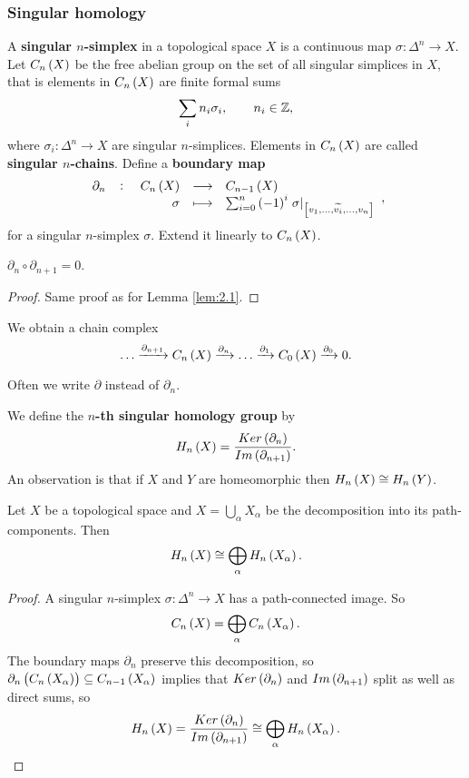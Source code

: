 \subsubsection{Singular homology}


A \textbf{singular $ n $-simplex} in a topological space $ X $ is a continuous map $ \sigma : \Delta^n \to X $. Let $ C_n\br{X} $ be the free abelian group on the set of all singular simplices in $ X $, that is elements in $ C_n\br{X} $ are finite formal sums
$$ \sum_i n_i \sigma_i, \qquad n_i \in \mathbb{Z}, $$
where $ \sigma_i : \Delta^n \to X $ are singular $ n $-simplices. Elements in $ C_n\br{X} $ are called \textbf{singular $ n $-chains}. Define a \textbf{boundary map}
$$ \function[\partial_n]{C_n\br{X}}{C_{n - 1}\br{X}}{\sigma}{\sum_{i = 0}^n \br{-1}^i\eval{\sigma}_{\sbr{v_1, \dots, \widetilde{v_i}, \dots, v_n}}}, $$
for a singular $ n $-simplex $ \sigma $. Extend it linearly to $ C_n\br{X} $.

\begin{lemma}
$ \partial_n \circ \partial_{n + 1} = 0 $.
\end{lemma}

\begin{proof}
Same proof as for Lemma \ref{lem:2.1}.
\end{proof}

We obtain a chain complex
$$ \dots \xrightarrow{\partial_{n + 1}} C_n\br{X} \xrightarrow{\partial_n} \dots \xrightarrow{\partial_1} C_0\br{X} \xrightarrow{\partial_0} 0. $$

\begin{remark*}
Often we write $ \partial $ instead of $ \partial_n $.
\end{remark*}

We define the \textbf{$ n $-th singular homology group} by
$$ H_n\br{X} = \dfrac{Ker\br{\partial_n}}{Im\br{\partial_{n + 1}}}. $$
An observation is that if $ X $ and $ Y $ are homeomorphic then $ H_n\br{X} \cong H_n\br{Y} $.

\begin{proposition}
\label{prop:2.6}
Let $ X $ be a topological space and $ X = \bigcup_\alpha X_\alpha $ be the decomposition into its path-components. Then
$$ H_n\br{X} \cong \bigoplus_\alpha H_n\br{X_\alpha}. $$
\end{proposition}

\begin{proof}
A singular $ n $-simplex $ \sigma : \Delta^n \to X $ has a path-connected image. So
$$ C_n\br{X} = \bigoplus_\alpha C_n\br{X_\alpha}. $$
The boundary maps $ \partial_n $ preserve this decomposition, so $ \partial_n\br{C_n\br{X_\alpha}} \subseteq C_{n - 1}\br{X_\alpha} $ implies that $ Ker\br{\partial_n} $ and $ Im\br{\partial_{n + 1}} $ split as well as direct sums, so
$$ H_n\br{X} = \dfrac{Ker\br{\partial_n}}{Im\br{\partial_{n + 1}}} \cong \bigoplus_\alpha H_n\br{X_\alpha}. $$
\end{proof}

